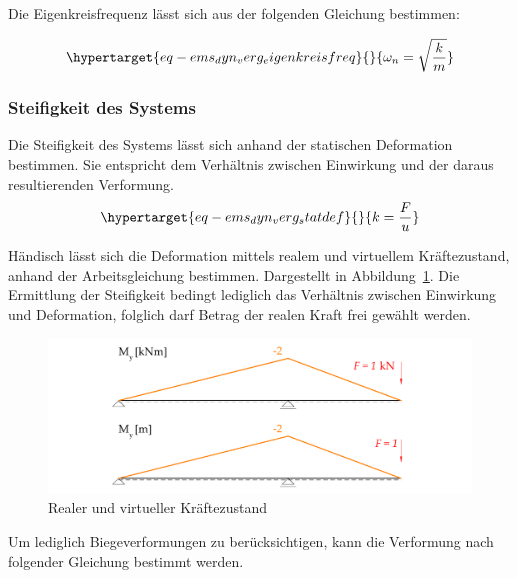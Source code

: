 \documentclass[
  letterpaper,
  DIV=11]{scrreprt}
\begin{document}
Die Eigenkreisfrequenz lässt sich aus der folgenden Gleichung bestimmen:

\begin{equation}\protect\hypertarget{eq-ems_dyn_verg_eigenkreisfreq}{}{
\omega_n = \sqrt{\frac{k}{m}}
}\label{eq-ems_dyn_verg_eigenkreisfreq}\end{equation}

\hypertarget{steifigkeit-des-systems}{%
\subsubsection{Steifigkeit des Systems}\label{steifigkeit-des-systems}}

Die Steifigkeit des Systems lässt sich anhand der statischen Deformation
bestimmen. Sie entspricht dem Verhältnis zwischen Einwirkung und der
daraus resultierenden Verformung.
\begin{equation}\protect\hypertarget{eq-ems_dyn_verg_statdef}{}{
k = \frac{F}{u}
}\label{eq-ems_dyn_verg_statdef}\end{equation}

Händisch lässt sich die Deformation mittels realem und virtuellem
Kräftezustand, anhand der Arbeitsgleichung bestimmen. Dargestellt in
Abbildung~\ref{fig-ems_dyn_verg_arbeitssatz}. Die Ermittlung der
Steifigkeit bedingt lediglich das Verhältnis zwischen Einwirkung und
Deformation, folglich darf Betrag der realen Kraft frei gewählt werden.

\begin{figure}[H]

{\centering \includegraphics{index_files/mediabag/bilder/aufgabe_ems_dynamischer_vergroesserungsfaktor_my_my_fik.pdf}

}

\caption{\label{fig-ems_dyn_verg_arbeitssatz}Realer und virtueller
Kräftezustand}

\end{figure}

Um lediglich Biegeverformungen zu berücksichtigen, kann die Verformung
nach folgender Gleichung bestimmt werden.
\end{document}
